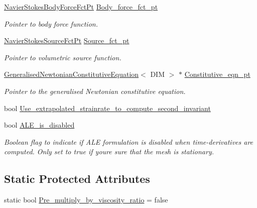 \begin{DoxyCompactItemize}
\hyperlink{classoomph_1_1GeneralisedNewtonianNavierStokesEquations_a0076b2b1b6ad17d306907c959b3f4d12}{Navier\+Stokes\+Body\+Force\+Fct\+Pt} \hyperlink{classoomph_1_1GeneralisedNewtonianNavierStokesEquations_aaa872748d87521afef44a72f5c125774}{Body\+\_\+force\+\_\+fct\+\_\+pt}
\begin{DoxyCompactList}\small\item\em Pointer to body force function. \end{DoxyCompactList}\item 
\hyperlink{classoomph_1_1GeneralisedNewtonianNavierStokesEquations_a817ff3b87362e53bf1d0594723b84573}{Navier\+Stokes\+Source\+Fct\+Pt} \hyperlink{classoomph_1_1GeneralisedNewtonianNavierStokesEquations_ac7c065324d62214ce4fb42f2e8040f6e}{Source\+\_\+fct\+\_\+pt}
\begin{DoxyCompactList}\small\item\em Pointer to volumetric source function. \end{DoxyCompactList}\item 
\hyperlink{classoomph_1_1GeneralisedNewtonianConstitutiveEquation}{Generalised\+Newtonian\+Constitutive\+Equation}$<$ D\+IM $>$ $\ast$ \hyperlink{classoomph_1_1GeneralisedNewtonianNavierStokesEquations_a1ec665651eead4fdb65ba2cd87cf1227}{Constitutive\+\_\+eqn\+\_\+pt}
\begin{DoxyCompactList}\small\item\em Pointer to the generalised Newtonian constitutive equation. \end{DoxyCompactList}\item 
bool \hyperlink{classoomph_1_1GeneralisedNewtonianNavierStokesEquations_a175556b0060e4b74b851798556243a9e}{Use\+\_\+extrapolated\+\_\+strainrate\+\_\+to\+\_\+compute\+\_\+second\+\_\+invariant}
\item 
bool \hyperlink{classoomph_1_1GeneralisedNewtonianNavierStokesEquations_a1a9cdb8ad05d69e91acbe3a7efde2993}{A\+L\+E\+\_\+is\+\_\+disabled}
\begin{DoxyCompactList}\small\item\em Boolean flag to indicate if A\+LE formulation is disabled when time-\/derivatives are computed. Only set to true if you\textquotesingle{}re sure that the mesh is stationary. \end{DoxyCompactList}\end{DoxyCompactItemize}
\subsection*{Static Protected Attributes}
\begin{DoxyCompactItemize}
\item 
static bool \hyperlink{classoomph_1_1GeneralisedNewtonianNavierStokesEquations_a0d4abb45881595224aa7e0c49ef4c4bd}{Pre\+\_\+multiply\+\_\+by\+\_\+viscosity\+\_\+ratio} = false
\end{DoxyCompactItemize}

